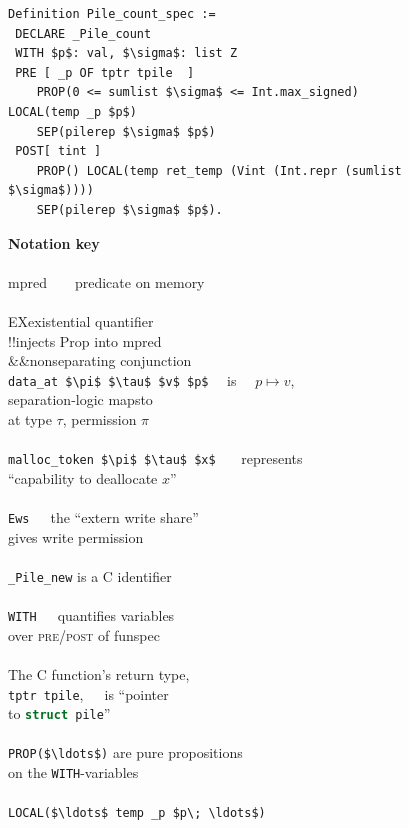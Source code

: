 \documentclass[runningheads,orivec]{llncs}
\begin{document}
\begin{figure}[tp]
\begin{minipage}[t]{3.2in}
\begin{lstlisting}[language=coq]
Definition Pile_count_spec :=
 DECLARE _Pile_count
 WITH $p$: val, $\sigma$: list Z
 PRE [ _p OF tptr tpile  ]
    PROP(0 <= sumlist $\sigma$ <= Int.max_signed) LOCAL(temp _p $p$)
    SEP(pilerep $\sigma$ $p$)
 POST[ tint ]
    PROP() LOCAL(temp ret_temp (Vint (Int.repr (sumlist $\sigma$))))
    SEP(pilerep $\sigma$ $p$).
\end{lstlisting}
\end{minipage}\begin{minipage}[t]{1.7in}
\color{blue!50!black}
\begin{tabbing}
\textbf{Notation key}\\    
~~~~~~\=\\
\textsf{mpred}~~~~predicate on memory\\
\\
\textsf{EX}\>existential quantifier\\
\textsf{!!}\>injects Prop into mpred\\
\textsf{\&\&}\>nonseparating conjunction\\
\lstinline{data_at $\pi$ $\tau$ $v$ $p$} ~~is~~ $p\mapsto v$,\\
\>separation-logic mapsto \\
\>at type $\tau$, permission $\pi$\\
\\
\lstinline{malloc_token $\pi$ $\tau$ $x$} ~~~represents\\
\>``capability to deallocate $x$''\\
\\
\lstinline{Ews}~~~the ``extern write share'' \\
\>gives write permission\\
\\
\lstinline{_Pile_new} is a C identifier\\
\\
\lstinline{WITH}~~~quantifies variables\\
\>over \textsc{pre/post} of funspec\\
\\
The C function's return type,\\
\>\lstinline{tptr tpile},~~~is ``pointer\\
\>to \lstinline[language=C]{struct pile}''\\
\\
\lstinline{PROP($\ldots$)} are pure propositions\\
\>on the \lstinline{WITH}-variables\\
\\
\lstinline{LOCAL($\ldots$ temp _p $p\; \ldots$)}\\

\end{tabbing}
\end{minipage}
\end{figure}
\end{document}
